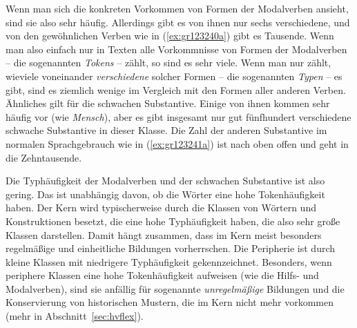 Wenn man sich die konkreten Vorkommen von Formen der Modalverben ansieht, sind sie also sehr häufig.
Allerdings gibt es von ihnen nur sechs verschiedene, und von den gewöhnlichen Verben wie in (\ref{ex:gr123240a}) gibt es Tausende.
Wenn man also einfach nur in Texten alle Vorkommnisse von Formen der Modalverben -- die sogenannten \textit{Tokens} -- zählt, so sind es sehr viele.
Wenn man nur zählt, wieviele voneinander \textit{verschiedene} solcher Formen -- die sogenannten \textit{Typen} -- es gibt, sind es ziemlich wenige im Vergleich mit den Formen aller anderen Verben.
Ähnliches gilt für die schwachen Substantive.
Einige von ihnen kommen sehr häufig vor (wie \textit{Mensch}), aber es gibt insgesamt nur gut fünfhundert verschiedene schwache Substantive in dieser Klasse.
Die Zahl der anderen Substantive im normalen Sprachgebrauch wie in (\ref{ex:gr123241a}) ist nach oben offen und geht in die Zehntausende.


Die Typhäufigkeit der Modalverben und der schwachen Substantive ist also gering.
Das ist unabhängig davon, ob die Wörter eine hohe Tokenhäufigkeit haben.
Der Kern wird typischerweise durch die Klassen von Wörtern und Konstruktionen besetzt, die eine hohe Typhäufigkeit haben, die also sehr große Klassen darstellen.
Damit hängt zusammen, dass im Kern meist besonders regelmäßige und einheitliche Bildungen vorherrschen.
Die Peripherie ist durch kleine Klassen mit niedrigere Typhäufigkeit gekennzeichnet.
Besonders, wenn periphere Klassen eine hohe Tokenhäufigkeit aufweisen (wie die Hilfs- und Modalverben), sind sie anfällig für sogenannte \textit{unregelmäßige} Bildungen und die Konservierung von historischen Mustern, die im Kern nicht mehr vorkommen (mehr in Abschnitt~\ref{sec:hvflex}).



